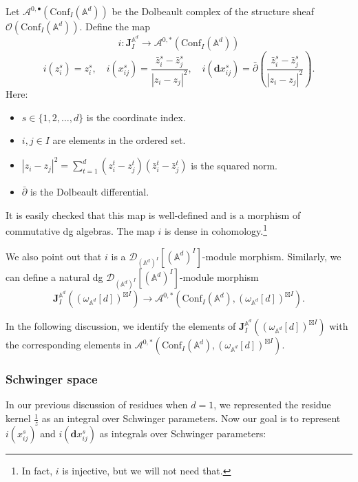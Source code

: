 \documentclass[11pt]{amsart}
\theoremstyle{definition}
\theoremstyle{remark}
\numberwithin{equation}{section}
\begin{document}
Let $\mathcal{A}^{0,\bullet}(\mathrm{Conf}_{ I}(\mathbb{A}^d))$ be the Dolbeault complex of the structure sheaf $\mathcal{O}(\mathrm{Conf}_{ I}(\mathbb{A}^{d}))$. Define the map
$$
i:\mathbf{J}_{ I}^{\mathbb{A}^{d}}\rightarrow\mathcal{A}^{0,*}(\mathrm{Conf}_{ I}(\mathbb{A}^d))
$$
$$
i(z_{i}^{s}) = z_{i}^{s},\quad i(x_{ij}^{s}) = \frac{\bar{z}_{i}^{s} - \bar{z}_{j}^{s}}{|z_{i} - z_{j}|^{2}},\quad i(\mathbf{d}x_{ij}^{s}) = \bar{\partial}\left(\frac{\bar{z}_{i}^{s} - \bar{z}_{j}^{s}}{|z_{i} - z_{j}|^{2}}\right).
$$
Here:
\begin{itemize}
    \item \(s \in \{1,2,\dots,d\}\) is the coordinate index.
    \item \(i, j \in  I\) are elements in the ordered set.
    \item \(|z_{i} - z_{j}|^{2} = \sum_{t=1}^{d}(z_{i}^{t} - z_{j}^{t})(\bar{z}_{i}^{t} - \bar{z}_{j}^{t})\) is the squared norm.
    \item \(\bar{\partial}\) is the Dolbeault differential.
\end{itemize}
It is easily checked that this map is well-defined and is a morphism of commutative dg algebras.
The map $i$ is dense in cohomology.\footnote{In fact, $i$
is injective, but we will not need that.}

We also point out that $i$ is a $\mathcal{D}_{(\mathbb{A}^{d})^{ I}}[(\mathbb{A}^{d})^{ I}]$-module morphism.
Similarly, we can define a natural dg $\mathcal{D}_{(\mathbb{A}^{d})^{ I}}[(\mathbb{A}^{d})^{ I}]$-module
morphism
\[
  \mathbf{J}_{ I}^{\mathbb{A}^{d}}((\omega_{\mathbb{A}^{d}}[d])^{\boxtimes I}) \to \mathcal{A}^{0,*}
  (\mathrm{Conf}_{ I}(\mathbb{A}^d),(\omega_{\mathbb{A}^{d}}[d])^{\boxtimes I}) . 
\]

In the following discussion, we identify the elements of $\mathbf{J}_{ I}^{\mathbb{A}^{d}}((\omega_{\mathbb{A}^{d}}[d])^{\boxtimes I})$ with the corresponding elements in $\mathcal{A}^{0,*}(\mathrm{Conf}_{ I}(\mathbb{A}^d),(\omega_{\mathbb{A}^{d}}[d])^{\boxtimes I})$. 

\subsubsection{Schwinger space}

In our previous discussion of residues when $d=1$, we represented the residue kernel $\frac{1}{z}$ as an integral over Schwinger parameters.
Now our goal is to represent $i(x_{ij}^{s})$ and $i(\mathbf{d}x_{ij}^{s})$ as integrals over Schwinger parameters:
\end{document}
